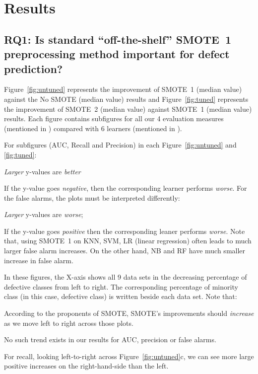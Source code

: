 \section{Results}
\label{sect:results}

\subsection{\textbf{RQ1: Is standard ``off-the-shelf'' SMOTE~1 preprocessing method important for defect prediction?}}
Figure~\ref{fig:untuned} represents the improvement of SMOTE~1 (median value) against the No SMOTE (median value) results and Figure~\ref{fig:tuned} represents the improvement of SMOTE~2 (median value) against SMOTE~1 (median value) results. Each figure contains subfigures for all our 4 evaluation measures (mentioned in ) compared with 6 learners (mentioned in ). 



For subfigures (AUC, Recall and Precision) in each Figure~\ref{fig:untuned} and \ref{fig:tuned}:
\bi
\item 
{\em Larger} y-values
are {\em better} 
\item
If the y-value goes {\em negative}, then the corresponding learner performs {\em worse}. 
\ei
For the false alarms, the
plots must be interpreted differently:
\bi
\item
{\em Larger} y-values are {\em worse};
\item
If the y-value goes {\em positive} then
the corresponding leaner
performs {\em worse}.
\ei
Note that, using SMOTE~1 on KNN, SVM,
LR (linear regression) often
leads to much larger false alarm increases.
On the other hand,   NB
and RF have much smaller
increase in false alarm.

In these figures, the
X-axis shows all 9 data sets in the decreasing percentage of defective classes from left to right. The corresponding percentage of minority class (in this case, defective class) is written beside each data set. Note that:
\bi
\item
According to the proponents
of SMOTE, SMOTE's improvements should
{\em increase} as we move left to right
across those plots.
\item
No such trend exists in our results for
AUC, precision or false alarms.
\item
For recall, looking left-to-right across
Figure~\ref{fig:untuned}c, we can see
more large positive increases on the
right-hand-side than the left.
\ei

